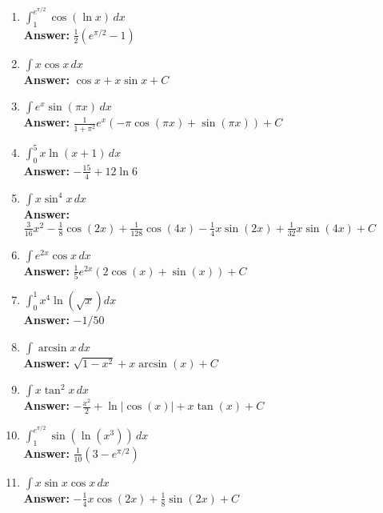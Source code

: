 \documentclass[letterpaper]{article}
\begin{document}
\begin{enumerate}
\begin{enumerate}
	\item $\int_1^{e^{\pi/2}} \cos (\ln x)\,dx$
	\\ \textbf{Answer:} $\frac12 (e^{\pi/2}-1)$

	\item $\displaystyle\int x\cos x\,dx$
	\\ \textbf{Answer:} $\cos x + x\sin x +C$

	\item $\displaystyle\int e^x \sin (\pi x)\,dx$
	\\ \textbf{Answer:} $\frac1{1+\pi^2} e^x(-\pi \cos(\pi x)+\sin(\pi x))+C$

	\item $\displaystyle\int_0^5 x\ln (x+1)\,dx$
	\\ \textbf{Answer:} $-\frac{15}4+12\ln 6$

	\item $\int x \sin^4 x\,dx$
	\\ \textbf{Answer:} $\frac{3}{16}x^2-\frac{1}{8} \cos(2 x)+\frac{1}{128} \cos(4 x)-\frac{1}{4} x \sin(2 x)+\frac{1}{32} x \sin(4 x)+C$

	\item $\int e^{2x} \cos x \,dx$
	\\ \textbf{Answer:} $\frac{1}{5} e^{2 x} (2 \cos(x)+\sin(x))+C$

	\item $\int_0^1 x^4 \ln(\sqrt x) dx$
	\\ \textbf{Answer:} $-1/50$

	\item $\int \arcsin x \, dx$
	\\ \textbf{Answer:} $\sqrt{1-x^2}+x \arcsin(x)+C$

	\item $\int x \tan^2 x\,dx$
	\\ \textbf{Answer:} $-\frac{x^2}{2}+\ln|\cos(x)|+x \tan(x)+C$

	\item $\int_1^{e^{\pi/2}} \sin (\ln (x^3))\,dx$
	\\ \textbf{Answer:} $\frac{1}{10} \left(3-e^{\pi /2}\right)$

	\item $\int x \sin x \cos x\,dx$
	\\ \textbf{Answer:} $-\frac{1}{4} x \cos(2 x)+\frac{1}{8} \sin(2 x)+C$


\end{enumerate}
\end{enumerate}
\end{document}
